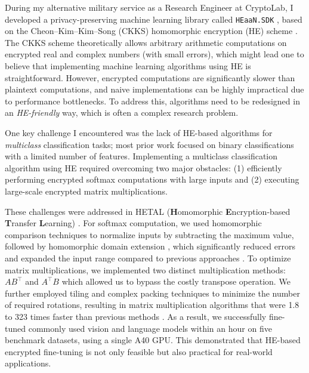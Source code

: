 \documentclass[12pt]{article}
\begin{document}
During my alternative military service as a Research Engineer at CryptoLab, I developed a privacy-preserving machine learning library called \texttt{HEaaN.SDK} \cite{heaansdk}, based on the Cheon--Kim--Kim--Song (CKKS) homomorphic encryption (HE) scheme \cite{cheon2017homomorphic}.
The CKKS scheme theoretically allows arbitrary arithmetic computations on encrypted real and complex numbers (with small errors), which might lead one to believe that implementing machine learning algorithms using HE is straightforward.
However, encrypted computations are significantly slower than plaintext computations, and naive implementations can be highly impractical due to performance bottlenecks.
To address this, algorithms need to be redesigned in an \emph{HE-friendly} way, which is often a complex research problem.

One key challenge I encountered was the lack of HE-based algorithms for \emph{multiclass} classification tasks; most prior work focused on binary classifications with a limited number of features.
Implementing a multiclass classification algorithm using HE required overcoming two major obstacles: (1) efficiently performing encrypted softmax computations with large inputs and (2) executing large-scale encrypted matrix multiplications.

These challenges were addressed in HETAL (\textbf{H}omomorphic \textbf{E}ncryption-based \textbf{T}ransfer \textbf{L}earning) \cite{lee2023hetal}. 
For softmax computation, we used homomorphic comparison techniques \cite{cheon2020efficient} to normalize inputs by subtracting the maximum value, followed by homomorphic domain extension \cite{cheon2022efficient}, which significantly reduced errors and expanded the input range compared to previous approaches \cite{jin2020secure,lee2022privacy,hong2022secure}.
To optimize matrix multiplications, we implemented two distinct multiplication methods: $AB^\intercal$ and $A^\intercal B$ which allowed us to bypass the costly transpose operation.
We further employed tiling and complex packing techniques to minimize the number of required rotations, resulting in matrix multiplication algorithms that were 1.8 to 323 times faster than previous methods \cite{crockett2020low,jin2020secure}.
As a result, we successfully fine-tuned commonly used vision and language models within an hour on five benchmark datasets, using a single A40 GPU. 
This demonstrated that HE-based encrypted fine-tuning is not only feasible but also practical for real-world applications.




{
\scriptsize
}
\end{document}
